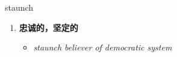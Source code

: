 
\begin{frame}
{\huge staunch}
\begin{center}
\begin{enumerate}\Large
  \item \textbf{忠诚的，坚定的}
  \begin{itemize}
    \item \em{\Large{staunch believer of democratic system}}
  \end{itemize}
\end{enumerate}
\end{center}
\end{frame}
